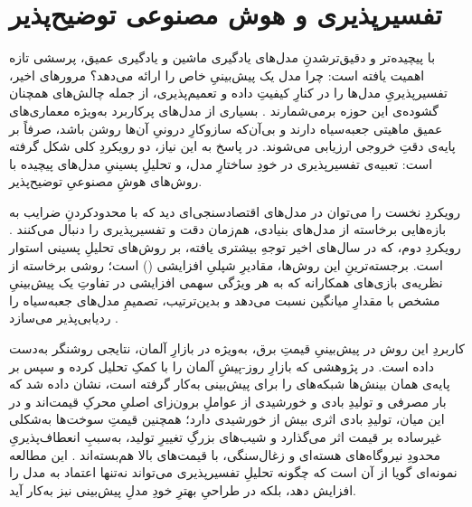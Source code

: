 \section{تفسیرپذیری و هوش مصنوعی توضیح‌پذیر}

با پیچیده‌تر و دقیق‌ترشدنِ مدل‌های یادگیری ماشین و یادگیری عمیق، پرسشی تازه اهمیت
یافته است: چرا مدل یک پیش‌بینیِ خاص را ارائه می‌دهد؟ مرورهای اخیر، تفسیرپذیریِ
مدل‌ها را در کنارِ کیفیتِ داده و تعمیم‌پذیری، از جمله چالش‌های همچنان گشوده‌ی این
حوزه برمی‌شمارند \cite{oconnor_review_2025}. بسیاری از مدل‌های پرکاربرد 
به‌ویژه معماری‌های عمیق  ماهیتی جعبه‌سیاه دارند و بی‌آن‌که سازوکارِ درونیِ
آن‌ها روشن باشد، صرفاً بر پایه‌ی دقتِ خروجی ارزیابی می‌شوند. در پاسخ به این نیاز،
دو رویکردِ کلی شکل گرفته است: تعبیه‌ی تفسیرپذیری در خودِ ساختارِ مدل، و تحلیلِ
پسینیِ مدل‌های پیچیده با روش‌های هوشِ مصنوعیِ توضیح‌پذیر.

رویکردِ نخست را می‌توان در مدل‌های اقتصادسنجی‌ای دید که با محدودکردنِ ضرایب به
بازه‌هایی برخاسته از مدل‌های بنیادی، هم‌زمان دقت و تفسیرپذیری را دنبال می‌کنند
\cite{ghelasi_day-ahead_2025}. رویکردِ دوم، که در سال‌های اخیر توجهِ بیشتری یافته،
بر روش‌های تحلیلِ پسینی استوار است. برجسته‌ترینِ این روش‌ها، مقادیرِ شپلیِ افزایشی
() است؛ روشی برخاسته از نظریه‌ی بازی‌های همکارانه که به هر ویژگی سهمی
افزایشی در تفاوتِ یک پیش‌بینیِ مشخص با مقدارِ میانگین نسبت می‌دهد و بدین‌ترتیب،
تصمیمِ مدل‌های جعبه‌سیاه را ردیابی‌پذیر می‌سازد \cite{trebbien_explainable_2023}.

کاربردِ این روش در پیش‌بینیِ قیمتِ برق، به‌ویژه در بازارِ آلمان، نتایجی روشنگر
به‌دست داده است. در پژوهشی که بازارِ روز-پیشِ آلمان را با کمکِ  تحلیل
کرده و سپس بر پایه‌ی همان بینش‌ها شبکه‌های  را برای پیش‌بینی به‌کار گرفته
است، نشان داده شد که بار مصرفی و تولیدِ بادی و خورشیدی از عواملِ برون‌زای اصلیِ
محرکِ قیمت‌اند و در این میان، تولیدِ بادی اثری بیش از خورشیدی دارد؛ همچنین قیمتِ
سوخت‌ها به‌شکلی غیرساده بر قیمت اثر می‌گذارد و شیب‌های بزرگِ تغییرِ تولید، به‌سببِ
انعطاف‌پذیریِ محدودِ نیروگاه‌های هسته‌ای و زغال‌سنگی، با قیمت‌های بالا هم‌بسته‌اند
\cite{trebbien_explainable_2023}. این مطالعه نمونه‌ای گویا از آن است که چگونه
تحلیلِ تفسیرپذیری می‌تواند نه‌تنها اعتماد به مدل را افزایش دهد، بلکه در طراحیِ
بهترِ خودِ مدلِ پیش‌بینی نیز به‌کار آید.

